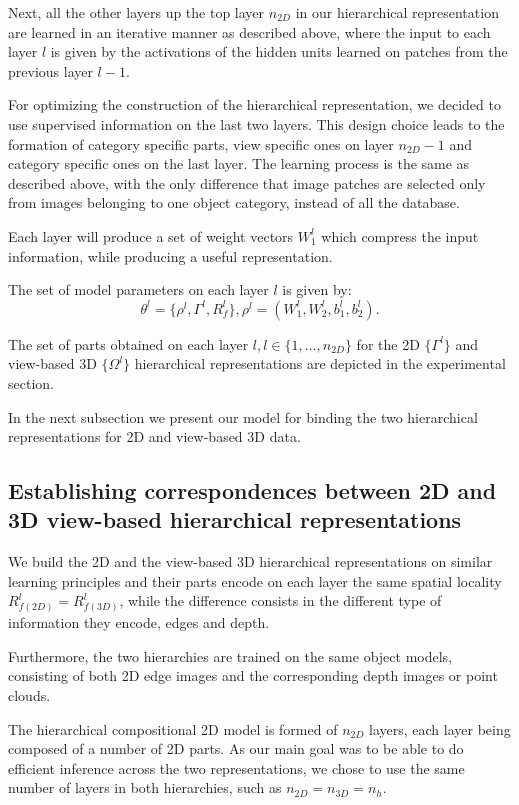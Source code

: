 \documentclass[runningheads]{llncs}
\begin{document}
Next, all the other layers up the top layer $n_{2D}$ in our hierarchical representation are learned in an iterative manner as described above, where the input to each layer $l$ is given by the activations of the hidden units learned on patches from the previous layer $l-1$.

For optimizing the construction of the hierarchical representation, we decided to use supervised information on the last two layers. This design choice leads to the formation of category specific parts, view specific ones on layer $n_{2D}-1$ and category specific ones on the last layer. The learning process is the same as described above, with the only difference that image patches are selected only from images belonging to one object category, instead of all the database.    

Each layer will produce a set of weight vectors $W_1^l$ which compress the input information, while producing a useful representation. 

The set of model parameters on each layer $l$ is  given by:
\begin{equation}
\theta^l = \{\rho^l,\Gamma^l,R_f^l\},
\rho^l=(W_1^l,W_2^l,b_1^l,b_2^l).
\end{equation}

The set of parts obtained on each layer $l,l\in\{1,\ldots,n_{2D}\}$ for the 2D $\{\Gamma^l\}$ and view-based 3D $\{\Omega^l\}$ hierarchical representations are depicted in the experimental section.

In the next subsection we present our model for binding the two hierarchical representations for 2D and view-based 3D data.
 
\subsection{Establishing correspondences between 2D and 3D view-based hierarchical representations}
\label{sec:analysis}

We build the 2D and the view-based 3D hierarchical representations on similar learning principles and their parts encode on each layer the same spatial locality $R_{f(2D)}^l=R_{f(3D)}^l$, while the difference consists in the different type of information they encode, edges and depth.
	
Furthermore, the two hierarchies are trained on the same object models, consisting of both 2D edge images and the corresponding depth images or point clouds.  

The hierarchical compositional 2D model is formed of $n_{2D}$ layers, each layer being composed of a number of 2D parts. 
As our main goal was to be able to do efficient inference across the two representations, we chose to use the same number of layers in both hierarchies, such as $n_{2D}=n_{3D}=n_h$.
\end{document}

